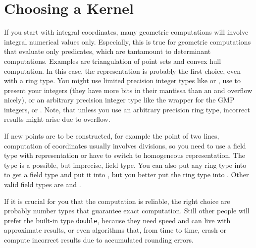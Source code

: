 \section{Choosing a Kernel}
If you start with integral  coordinates, many 
geometric computations will involve integral numerical values only. Especially, 
this is true for geometric computations that evaluate only predicates, which 
are tantamount to determinant computations. Examples are triangulation of 
point sets and convex hull computation.  In this case, the 
 representation is probably the first choice, 
even with a ring type. You might use limited precision integer types like
 or , use  to present your integers (they
have more bits in their mantissa than an  and overflow nicely), or an 
arbitrary precision integer type like the wrapper  for the
GMP integers,  or . Note, that unless you use
an arbitrary precision ring type, incorrect results might arise due to
overflow. 

If new points are to be constructed, for example
the  point of two lines, computation of 
 coordinates usually involves divisions, so
you need to use a field type with  representation
or have to switch to homogeneous representation. 
The type  is a possible, but imprecise, field type.
You can also put any ring type into  to get a
field type and put it into , but you better put
the ring type into .
Other valid field types are  and .

If it is crucial for you that the computation is reliable, 
the right choice are probably number types that guarantee
exact computation. 
Still other people will prefer the built-in
type {\tt double}, because they need speed and can live with
approximate results, or even algorithms that, from time to time,
crash or compute incorrect results due to accumulated rounding errors.
